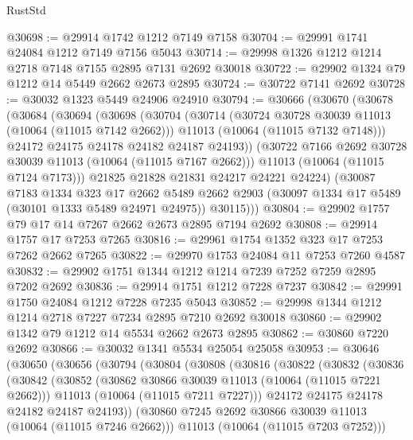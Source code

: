 \begin{lexlean}{RustStd}
\begin{coremodule}
@30698 := @29914 @1742 @1212 @7149 @7158
@30704 := @29991 @1741 @24084 @1212 @7149 @7156 @5043
@30714 := @29998 @1326 @1212 @1214 @2718 @7148 @7155 @2895 @7131 @2692 @30018
@30722 := @29902 @1324 @79 @1212 @14 @5449 @2662 @2673 @2895
@30724 := @30722 @7141 @2692
@30728 := @30032 @1323 @5449 @24906 @24910
@30794 := @30666
    (@30670
      (@30678
        (@30684
          (@30694
            (@30698
              (@30704
                (@30714
                  (@30724 @30728 @30039 @11013 (@10064 (@11015 @7142 @2662)))
                  @11013
                  (@10064 (@11015 @7132 @7148)))
                @24172
                @24175
                @24178
                @24182
                @24187
                @24193))
            (@30722 @7166 @2692 @30728 @30039 @11013 (@10064 (@11015 @7167 @2662)))
            @11013
            (@10064 (@11015 @7124 @7173)))
          @21825
          @21828
          @21831
          @24217
          @24221
          @24224)
        (@30087
          @7183
          @1334
          @323
          @17
          @2662
          @5489
          @2662
          @2903
          (@30097 @1334 @17 @5489 (@30101 @1333 @5489 @24971 @24975))
          @30115)))
@30804 := @29902 @1757 @79 @17 @14 @7267 @2662 @2673 @2895 @7194 @2692
@30808 := @29914 @1757 @17 @7253 @7265
@30816 := @29961 @1754 @1352 @323 @17 @7253 @7262 @2662 @7265
@30822 := @29970 @1753 @24084 @11 @7253 @7260 @4587
@30832 := @29902 @1751 @1344 @1212 @1214 @7239 @7252 @7259 @2895 @7202 @2692
@30836 := @29914 @1751 @1212 @7228 @7237
@30842 := @29991 @1750 @24084 @1212 @7228 @7235 @5043
@30852 := @29998 @1344 @1212 @1214 @2718 @7227 @7234 @2895 @7210 @2692 @30018
@30860 := @29902 @1342 @79 @1212 @14 @5534 @2662 @2673 @2895
@30862 := @30860 @7220 @2692
@30866 := @30032 @1341 @5534 @25054 @25058
@30953 := @30646
    (@30650
      (@30656
        (@30794
          (@30804
            (@30808
              (@30816
                (@30822
                  (@30832
                    (@30836
                      (@30842
                        (@30852
                          (@30862 @30866 @30039 @11013 (@10064 (@11015 @7221 @2662)))
                          @11013
                          (@10064 (@11015 @7211 @7227)))
                        @24172
                        @24175
                        @24178
                        @24182
                        @24187
                        @24193))
                    (@30860 @7245 @2692 @30866 @30039 @11013 (@10064 (@11015 @7246 @2662)))
                    @11013
                    (@10064 (@11015 @7203 @7252)))

\end{coremodule}
\end{lexlean}
